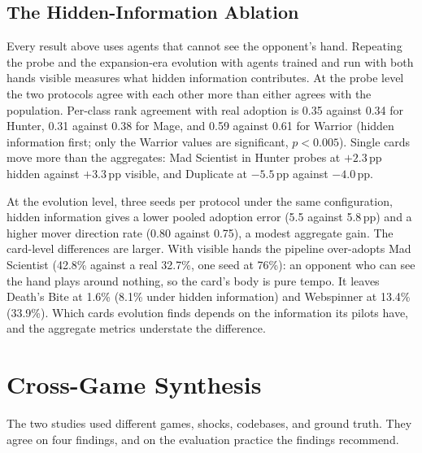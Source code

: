 \documentclass[journal]{IEEEtran}
\newcommand{\pp}{\,\text{pp}}
\begin{document}
\subsection{The Hidden-Information Ablation}
\label{sec:hsinfo}

Every result above uses agents that cannot see the opponent's hand.
Repeating the probe and the expansion-era evolution with agents trained
and run with both hands visible measures what hidden information
contributes. At the probe level the two protocols agree with each other
more than either agrees with the population. Per-class rank agreement
with real adoption is 0.35 against 0.34 for Hunter, 0.31 against 0.38
for Mage, and 0.59 against 0.61 for Warrior (hidden information first;
only the Warrior values are significant, $p<0.005$). Single cards move
more than the aggregates: Mad Scientist in Hunter probes at $+2.3\pp$
hidden against $+3.3\pp$ visible, and Duplicate at $-5.5\pp$ against
$-4.0\pp$.

At the evolution level, three seeds per protocol under the same
configuration, hidden information gives a lower pooled adoption error
(5.5 against 5.8$\pp$) and a higher mover direction rate (0.80 against
0.75), a modest aggregate gain. The card-level differences are larger.
With visible hands the pipeline over-adopts Mad Scientist (42.8\%
against a real 32.7\%, one seed at 76\%): an opponent who can see the
hand plays around nothing, so the card's body is pure tempo. It leaves
Death's Bite at 1.6\% (8.1\% under hidden information) and Webspinner at
13.4\% (33.9\%). Which cards evolution finds depends on the information
its pilots have, and the aggregate metrics understate the difference.

\section{Cross-Game Synthesis}
\label{sec:synthesis}

The two studies used different games, shocks, codebases, and ground truth. They agree on four findings, and on the evaluation practice the findings recommend.
\end{document}
